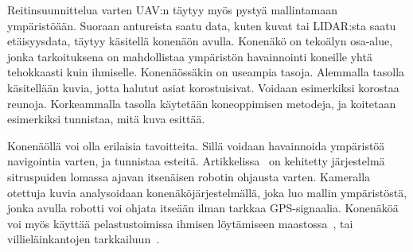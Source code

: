 Reitinsuunnittelua varten UAV:n täytyy myös pystyä mallintamaan ympäristöään.
Suoraan antureista saatu data, kuten kuvat tai LIDAR:sta saatu etäisyysdata,
täytyy käsitellä konenäön avulla.
Konenäkö on tekoälyn osa-alue, jonka tarkoituksena on mahdollistaa ympäristön
havainnointi koneille yhtä tehokkaasti kuin ihmiselle. Konenäössäkin on
useampia tasoja. Alemmalla tasolla käsitellään kuvia, jotta halutut asiat
korostuisivat. Voidaan esimerkiksi korostaa reunoja. Korkeammalla tasolla
käytetään koneoppimisen metodeja, ja koitetaan esimerkiksi tunnistaa, mitä kuva
esittää.~\cite{Davies2012}

Konenäöllä voi olla erilaisia tavoitteita.
Sillä voidaan havainnoida ympäristöä navigointia varten, ja tunnistaa esteitä.
Artikkelissa~\cite{Subramanian2006} on kehitetty järjestelmä sitruspuiden
lomassa ajavan itsenäisen robotin ohjausta varten. Kameralla otettuja kuvia
analysoidaan konenäköjärjestelmällä, joka luo mallin ympäristöstä, jonka avulla
robotti voi ohjata itseään ilman tarkkaa GPS-signaalia.
Konenäköä voi myös käyttää pelastustoimissa ihmisen löytämiseen
maastossa~\cite{Rudol2008}, tai villieläinkantojen
tarkkailuun~\cite{Gonzalez2016}.

